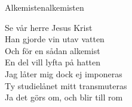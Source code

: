 \begin{song}{Alkemisten}{alkemisten}
\begin{vers}
Se vår herre Jesus Krist\\
Han gjorde vin utav vatten\\
Och för en sådan alkemist\\
En del vill lyfta på hatten\\
Jag låter mig dock ej imponeras\\
Ty studielånet mitt transmuteras\\
Ja det görs om, och blir till rom
\end{vers}
\end{song}